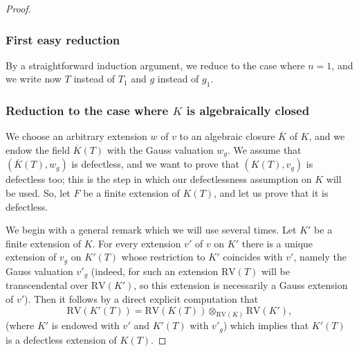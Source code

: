 \documentclass[JEP,XML,SOM,Unicode,ThmDefs,NoEqCountersInSection,published]{cedram}
\theoremstyle{plain}
\theoremstyle{definition}
\begin{document}
\begin{proof}
\subsubsection{First easy reduction}
By a straightforward induction argument, we reduce to the case where $n=1$, and we write now
$T$ instead of $T_1$ and $g$ instead of $g_1$.

\subsubsection{Reduction to the case where $K$ is algebraically closed}
\label{reduc-case-algclosed}
We choose an arbitrary extension $w$
of $v$
to an algebraic closure $\overline K$ of $K$, and we endow
the field $\overline K(T)$
with the Gauss valuation $w_g$.
We assume that
$(\overline K(T),w_g)$ is defectless, and we want to prove that $(K(T),v_g)$ is
defectless too; this is the step in which our defectlessness assumption
on $K$ will be used. So, let $F$ be a finite extension of $K(T)$, and let us prove that it is defectless.

We begin with a general remark which we will
use several times. Let $K'$ be a finite extension of $K$. For every extension $v'$ of $v$
on $K'$ there is a unique extension of $v_g$ on $K'(T)$ whose restriction to $K'$ coincides with $v'$, namely the Gauss valuation
$v'_g$ (indeed, for such an extension $\mathrm{RV}(T)$ will be transcendental over $\mathrm{RV}(K')$, so this extension
is necessarily a Gauss extension of $v'$). Then it follows by a direct explicit computation that
\[\mathrm{RV}(K'(T))=\mathrm{RV}(K(T))\otimes_{\mathrm{RV}(K)}\mathrm{RV}(K'),\]
(where
$K'$ is endowed with $v'$ and $K'(T)$ with
$v'_g$)
which implies that $K'(T)$ is a defectless extension of $K(T)$.


\end{proof}
\end{document}
